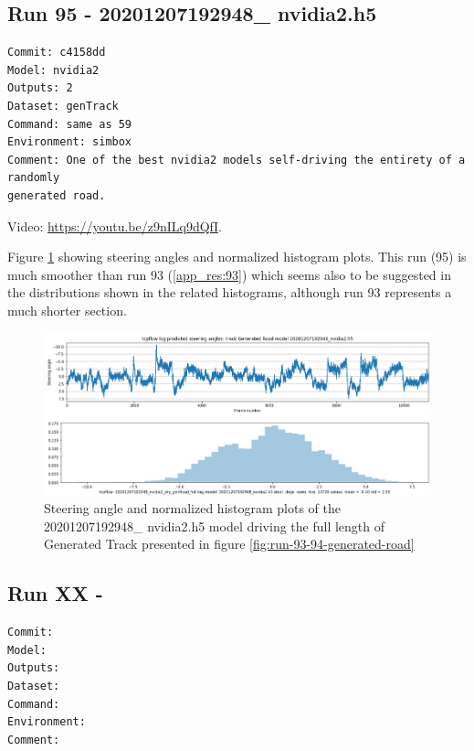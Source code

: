 \subsection{Run 95 - 20201207192948\_ nvidia2.h5 }
\begin{verbatim}
Commit: c4158dd
Model: nvidia2
Outputs: 2
Dataset: genTrack   
Command: same as 59
Environment: simbox
Comment: One of the best nvidia2 models self-driving the entirety of a randomly
generated road.

\end{verbatim}
Video: \url{https://youtu.be/z9nILq9dQfI}.

Figure \ref{fig:20201207192948_nvidia2_dry_genRoad_full} showing steering angles and normalized histogram plots. This run (95) is much smoother than run 93 (\ref{app_res:93}) which seems also to be suggested in the distributions shown in the related histograms, although run 93 represents a much shorter section.
\begin{figure}[ht]
 \centering 
 \includegraphics[width=\textwidth]{Figures/20201207192948_nvidia2_dry_genRoad_full.png}
 \caption{Steering angle and normalized histogram plots of the 20201207192948\_ nvidia2.h5 model driving the full length of Generated Track presented in figure \ref{fig:run-93-94-generated-road} }
 \label{fig:20201207192948_nvidia2_dry_genRoad_full} 
\end{figure}


\subsection{Run XX -  }
\begin{verbatim}
Commit:
Model: 
Outputs: 
Dataset: 
Command:
Environment: 
Comment: 
\end{verbatim}





